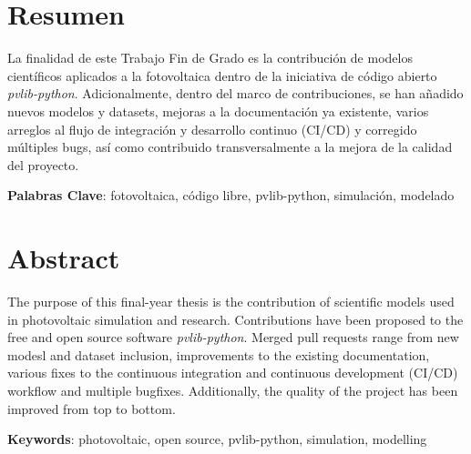 \chapter*{Resumen} \label{chp:abstract}

La finalidad de este Trabajo Fin de Grado es la contribución de modelos científicos aplicados a la fotovoltaica dentro de la iniciativa de código abierto \textit{pvlib-python}. Adicionalmente, dentro del marco de contribuciones, se han añadido nuevos modelos y datasets, mejoras a la documentación ya existente, varios arreglos al flujo de integración y desarrollo continuo (CI/CD) y corregido múltiples bugs, así como contribuido transversalmente a la mejora de la calidad del proyecto.

\textbf{Palabras Clave}: fotovoltaica, código libre, pvlib-python, simulación, modelado


\newpage


\chapter*{Abstract}

The purpose of this final-year thesis is the contribution of scientific models used in photovoltaic simulation and research. Contributions have been proposed to the free and open source software \textit{pvlib-python}. Merged pull requests range from new modesl and dataset inclusion, improvements to the existing documentation, various fixes to the continuous integration and continuous development (CI/CD) workflow and multiple bugfixes. Additionally, the quality of the project has been improved from top to bottom.

\textbf{Keywords}: photovoltaic, open source, pvlib-python, simulation, modelling
